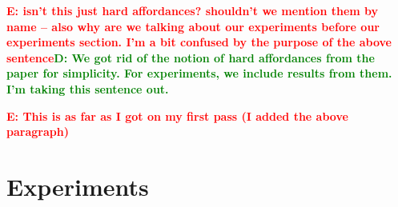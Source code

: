 \documentclass[conference]{IEEEtran}
\newcommand{\dnote}[1]{\textcolor{Green}{\textbf{D: #1}}}
\newcommand{\enote}[1]{\textcolor{Red}{\textbf{E: #1}}}
\begin{document}

\enote{isn't this just hard affordances? shouldn't we mention them by name -- also why are we talking about our experiments before our experiments section. I'm a bit confused by the purpose of the above sentence}\dnote{We got rid of the notion of hard affordances from the paper for simplicity. For experiments, we include results from them. I'm taking this sentence out.}

\enote{This is as far as I got on my first pass (I added the above paragraph)}


\section{Experiments}
\label{sec:experiments}
\end{document}

